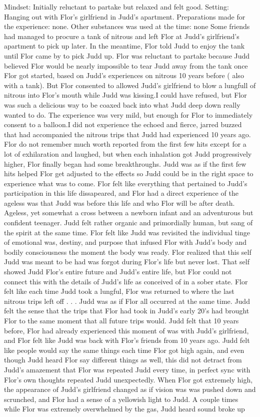 \documentclass[12pt]{book}
\begin{document}
Mindset: Initially reluctant to partake but relaxed and felt good. Setting: Hanging out with Flor's girlfriend in Judd's apartment. Preparations made for the experience: none. Other substances was used at the time: none Some friends had managed to procure a tank of nitrous and left Flor at Judd's girlfriend's apartment to pick up later. In the meantime, Flor told Judd to enjoy the tank until Flor came by to pick Judd up. Flor was reluctant to partake because Judd believed Flor would be nearly impossible to tear Judd away from the tank once Flor got started, based on Judd's experiences on nitrous 10 years before ( also with a tank). But Flor consented to allowed Judd's girlfriend to blow a lungfull of nitrous into Flor's mouth while Judd was kissing.I could have refused, but Flor was such a delicious way to be coaxed back into what Judd deep down really wanted to do. The experience was very mild, but enough for Flor to immediately consent to a balloon.I did not experience the echoed and fierce, jarred buzzed that had accompanied the nitrous trips that Judd had experienced 10 years ago. Flor do not remember much worth reported from the first few hits except for a lot of exhilaration and laughed, but when each inhalation got Judd progressively higher, Flor finally began had some breakthroughs. Judd was as if the first few hits helped Flor get adjusted to the effects so Judd could be in the right space to experience what was to come. Flor felt like everything that pertained to Judd's participation in this life dissapeared, and Flor had a direct experience of the ageless was that Judd was before this life and who Flor will be after death. Ageless, yet somewhat a cross between a newborn infant and an adventurous but confident teenager. Judd felt rather organic and primordially human, but sang of the spirit at the same time. Flor felt like Judd was revisited the individual tinge of emotional was, destiny, and purpose that infused Flor with Judd's body and bodily consciousness the moment the body was ready. Flor realized that this self Judd was meant to be had was forgot during Flor's life but never lost. That self showed Judd Flor's entire future and Judd's entire life, but Flor could not connect this with the details of Judd's life as conceived of in a sober state. Flor felt like each time Judd took a lungful, Flor was returned to where the last nitrous trips left off . . .  Judd was as if Flor all occurred at the same time. Judd felt the sense that the trips that Flor had took in Judd's early 20's had brought Flor to the same moment that all future trips would. Judd felt that 10 years before, Flor had already experienced this moment of was with Judd's girlfriend, and Flor felt like Judd was back with Flor's friends from 10 years ago. Judd felt like people would say the same things each time Flor got high again, and even though Judd heard Flor say different things as well, this did not detract from Judd's amazement that Flor was repeated Judd every time, in perfect sync with Flor's own thoughts repeated Judd unexpectedly. When Flor got extremely high, the appearance of Judd's girlfriend changed as if vision was was pushed down and scrunched, and Flor had a sense of a yellowish light to Judd. A couple times while Flor was extremely overwhelmed by the gas, Judd heard sound broke up 
\end{document}
